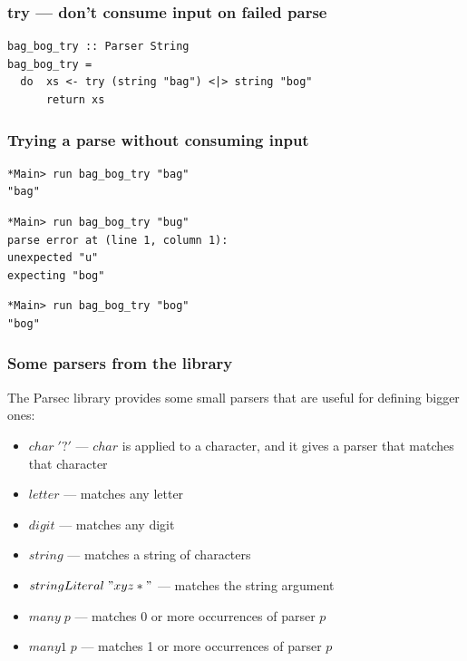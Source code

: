 \documentclass{beamer}
\begin{document}
\begin{frame}[fragile]
\frametitle{try --- don't consume input on failed parse}

\begin{verbatim}
bag_bog_try :: Parser String
bag_bog_try =
  do  xs <- try (string "bag") <|> string "bog"
      return xs
\end{verbatim}

\end{frame}

\begin{frame}[fragile]
\frametitle{Trying a parse without consuming input}

{\footnotesize
\begin{verbatim}
*Main> run bag_bog_try "bag"
"bag"
\end{verbatim}
}

{\footnotesize
\begin{verbatim}
*Main> run bag_bog_try "bug"
parse error at (line 1, column 1):
unexpected "u"
expecting "bog"
\end{verbatim}
}

{\footnotesize
\begin{verbatim}
*Main> run bag_bog_try "bog"
"bog"
\end{verbatim}
}

\end{frame}


\begin{frame}[fragile]
\frametitle{Some parsers from the library}

The Parsec library provides some  small parsers that are useful for
defining bigger ones:

\begin{itemize}
\item $char\; '?'$ --- $char$ is applied to a character, and it gives a
  parser that matches that character  
\item $letter$ --- matches any letter
\item $digit$ --- matches any digit
\item $string$ --- matches a string of characters
\item $stringLiteral\; "xyz*"$ --- matches the string argument
\item $many\; p$ --- matches 0 or more occurrences of parser $p$
\item $many1\; p$ --- matches 1 or more occurrences of parser $p$
\end{itemize}

\end{frame}
\end{document}
